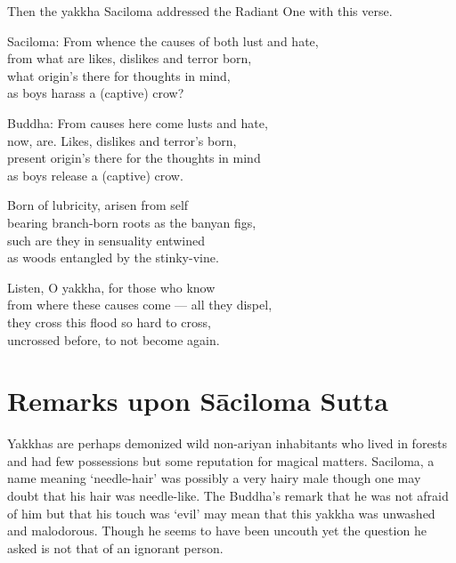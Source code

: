 Then the yakkha Saciloma addressed the Radiant One with this verse.

\begin{MyDescription}{Saciloma:}
From whence the causes of both lust and hate,\\
from what are likes, dislikes and terror born,\\
what origin's there for thoughts in mind,\\
as boys harass a (captive) crow?
\end{MyDescription}

\begin{MyDescription}{Buddha:}
From causes here come lusts and hate,\\
now, are. Likes, dislikes and terror's born,\\
present origin's there for the thoughts in mind\\
as boys release a (captive) crow.
\end{MyDescription}

\begin{MyDescription}{}
Born of lubricity, arisen from self\\
bearing branch-born roots as the banyan ﬁgs,\\
such are they in sensuality entwined\\
as woods entangled by the stinky-vine.
\end{MyDescription}

\begin{MyDescription}{}
Listen, O yakkha, for those who know\\
from where these causes come — all they dispel,\\
they cross this ﬂood so hard to cross,\\
uncrossed before, to not become again.
\end{MyDescription}

\begin{MyDescription}[(Sn. 270-273)]{}
\end{MyDescription}
\newpage
\section{Remarks upon S\=aciloma Sutta}
Yakkhas are perhaps demonized wild non-ariyan inhabitants who lived in forests and had few possessions but some reputation for magical matters. Saciloma, a name meaning `needle-hair' was possibly a very hairy male though one may doubt that his hair was needle-like. The Buddha's remark that he was not afraid of him but that his touch was `evil' may mean that this yakkha was unwashed and malodorous. Though he seems to have been uncouth yet the question he asked is not that of an ignorant person.\\

